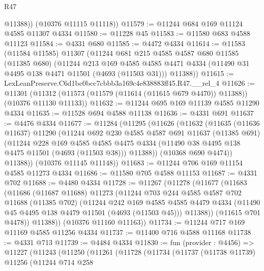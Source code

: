 \begin{lexlean}{R47}
\begin{coremodule}
          @11388))
      (@10376 @11115 @11118))
@11579 := @11244 @684 @169 @11124 @4585 @11307 @4334
@11580 := @11228 @45
@11583 := @11580 @683 @4588 @11123
@11584 := @4331 @680
@11585 := @4472 @4334
@11614 := @11583
    (@11584 @11585)
    @11307
    (@11244
      @681
      @215
      @4585
      @4587
      @680
      @11585
      (@11385 @680)
      (@11244
        @213
        @169
        @4585
        @4585
        @4471
        @4334
        (@11490 @31 @4495 @138 @4471 @11501 (@4693 (@11503 @31)))
        @11388))
@11615 := LexLeanPreserve.C6d1bc0bcc7cbbb3a169c4e838883ff45.R47.__rel_4
@11626 := @11301
    (@11312 (@11573 (@11579 (@11614 (@11615 @679 @4470)) @11388)) (@10376 @11130 @11133))
@11632 := @11244 @695 @169 @11139 @4585 @11290 @4334
@11635 := @11528 @694 @4588 @11138
@11636 := @4331 @691
@11637 := @4476 @4334
@11677 := @11284
    (@11295
      (@11626
        (@11632
          (@11635
            (@11636 @11637)
            @11290
            (@11244
              @692
              @230
              @4585
              @4587
              @691
              @11637
              (@11385 @691)
              (@11244
                @228
                @169
                @4585
                @4585
                @4475
                @4334
                (@11490 @38 @4495 @138 @4475 @11501 (@4693 (@11503 @38)))
                @11388))
            (@10368 @690 @4474))
          @11388))
      (@10376 @11145 @11148))
@11683 := @11244 @706 @169 @11154 @4585 @11273 @4334
@11686 := @11580 @705 @4588 @11153
@11687 := @4331 @702
@11688 := @4480 @4334
@11728 := @11267
    (@11278
      (@11677
        (@11683
          (@11686
            (@11687 @11688)
            @11273
            (@11244
              @703
              @244
              @4585
              @4587
              @702
              @11688
              (@11385 @702)
              (@11244
                @242
                @169
                @4585
                @4585
                @4479
                @4334
                (@11490 @45 @4495 @138 @4479 @11501 (@4693 (@11503 @45)))
                @11388))
            (@11615 @701 @4478))
          @11388))
      (@10376 @11160 @11163))
@11734 := @11244 @717 @169 @11169 @4585 @11256 @4334
@11737 := @11400 @716 @4588 @11168
@11738 := @4331 @713
@11739 := @4484 @4334
@11830 := fun (provider : @4456) =>
  @11227
    (@11243
      (@11250
        (@11261
          (@11728
            (@11734
              (@11737
                (@11738 @11739)
                @11256
                (@11244
                  @714
                  @258

\end{coremodule}
\end{lexlean}
